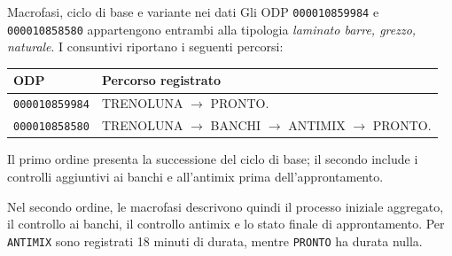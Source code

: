 \begin{examplebox}{Macrofasi, ciclo di base e variante nei dati}
Gli ODP \texttt{000010859984} e \texttt{000010858580} appartengono entrambi alla tipologia \emph{laminato barre, grezzo, naturale}. I consuntivi riportano i seguenti percorsi:

\begin{center}
\begin{tabularx}{\linewidth}{@{}l>{\raggedright\arraybackslash}X@{}}
\toprule
\textbf{ODP} & \textbf{Percorso registrato} \\
\midrule
\texttt{000010859984} & TRENOLUNA $\rightarrow$ PRONTO. \\
\addlinespace
\texttt{000010858580} & TRENOLUNA $\rightarrow$ BANCHI $\rightarrow$ ANTIMIX $\rightarrow$ PRONTO. \\
\bottomrule
\end{tabularx}
\end{center}

Il primo ordine presenta la successione del ciclo di base; il secondo include i controlli aggiuntivi ai banchi e all'antimix prima dell'approntamento.

Nel secondo ordine, le macrofasi descrivono quindi il processo iniziale aggregato, il controllo ai banchi, il controllo antimix e lo stato finale di approntamento. Per \texttt{ANTIMIX} sono registrati 18 minuti di durata, mentre \texttt{PRONTO} ha durata nulla.
\end{examplebox}
